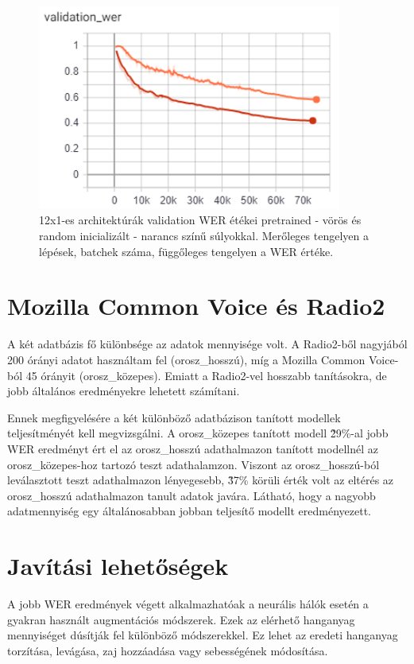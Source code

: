 \begin{figure}[!ht]
\centering
\includegraphics[width=100mm, keepaspectratio]{figures/12x1_pretrained_vs_random.png}
\caption{12x1-es architektúrák validation WER étékei pretrained - vörös és random inicializált - narancs színű súlyokkal. Merőleges tengelyen a lépések, batchek száma, függőleges tengelyen a WER értéke.}
\end{figure}

\section{Mozilla Common Voice és Radio2}

A két adatbázis fő különbsége az adatok mennyisége volt. A Radio2-ből nagyjából 200 órányi adatot használtam fel (orosz\_hosszú), míg a Mozilla Common Voice-ból 45 órányit (orosz\_közepes). Emiatt a Radio2-vel hosszabb tanításokra, de jobb általános eredményekre lehetett számítani.

Ennek megfigyelésére a két különböző adatbázison tanított modellek teljesítményét kell megvizsgálni. A orosz\_közepes tanított modell \~29\%-al jobb WER eredményt ért el az orosz\_hosszú adathalmazon tanított modellnél az orosz\_közepes-hoz tartozó teszt adathalamzon. Viszont az orosz\_hosszú-ból leválasztott teszt adathalmazon lényegesebb, \~37\% körüli érték volt az eltérés az orosz\_hosszú adathalmazon tanult adatok javára. Látható, hogy a nagyobb adatmennyiség egy általánosabban jobban teljesítő modellt eredményezett.

\section{Javítási lehetőségek}

A jobb WER eredmények végett alkalmazhatóak a neurális hálók esetén a gyakran használt augmentációs módszerek. Ezek az elérhető hanganyag mennyiséget dúsítják fel különböző módszerekkel. Ez lehet az eredeti hanganyag torzítása, levágása, zaj hozzáadása vagy sebességének módosítása.


